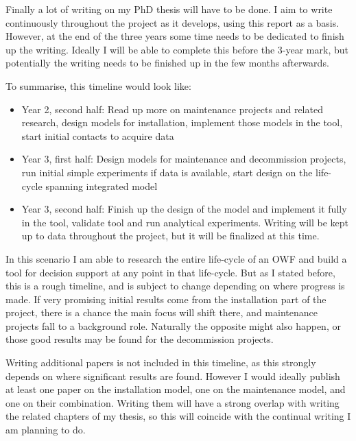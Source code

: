 \documentclass[a4paper,12pt]{article}
\begin{document}
Finally a lot of writing on my PhD thesis will have to be done. I aim to write continuously throughout the project as it develops, using this report as a basis. However, at the end of the three years some time needs to be dedicated to finish up the writing. Ideally I will be able to complete this before the 3-year mark, but potentially the writing needs to be finished up in the few months afterwards. 

\bigskip

To summarise, this timeline would look like:

\begin{itemize}
	\item Year 2, second half: Read up more on maintenance projects and related research, design models for installation, implement those models in the tool, start initial contacts to acquire data
	\item Year 3, first half: Design models for maintenance and decommission projects, run initial simple experiments if data is available, start design on the life-cycle spanning integrated model
	\item Year 3, second half: Finish up the design of the model and implement it fully in the tool, validate tool and run analytical experiments. Writing will be kept up to data throughout the project, but it will be finalized at this time. 
\end{itemize}

In this scenario I am able to research the entire life-cycle of an OWF and build a tool for decision support at any point in that life-cycle. But as I stated before, this is a rough timeline, and is subject to change depending on where progress is made. If very promising initial results come from the installation part of the project, there is a chance the main focus will shift there, and maintenance projects fall to a background role. Naturally the opposite might also happen, or those good results may be found for the decommission projects. 

Writing additional papers is not included in this timeline, as this strongly depends on where significant results are found. However I would ideally publish at least one paper on the installation model, one on the maintenance model, and one on their combination. Writing them will have a strong overlap with writing the related chapters of my thesis, so this will coincide with the continual writing I am planning to do. 

\pagebreak




\end{document}
